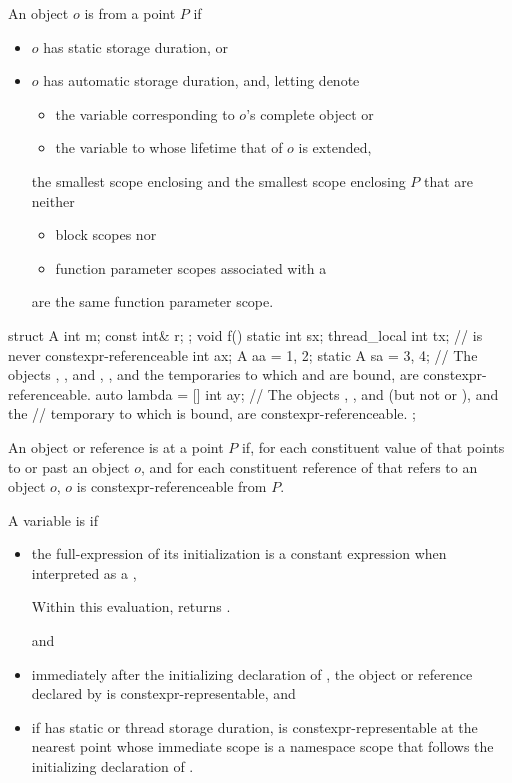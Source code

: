 \pnum
An object $o$ is  from a point $P$ if
\begin{itemize}
\item
$o$ has static storage duration, or
\item
$o$ has automatic storage duration, and, letting  denote
\begin{itemize}
\item
the variable corresponding to $o$'s complete object or
\item
the variable to whose lifetime that of $o$ is extended,
\end{itemize}
the smallest scope enclosing  and the smallest scope enclosing $P$
that are neither
\begin{itemize}
\item
block scopes nor
\item
function parameter scopes associated with
a 
\end{itemize}
are the same function parameter scope.
\end{itemize}
\begin{example}
\begin{codeblock}
struct A {
  int m;
  const int& r;
};
void f() {
  static int sx;
  thread_local int tx;                  //  is never constexpr-referenceable
  int ax;
  A aa = {1, 2};
  static A sa = {3, 4};
  // The objects , , and , , and the temporaries to which  and  are bound, are constexpr-referenceable.
  auto lambda = [] {
    int ay;
    // The objects , , and  (but not  or ), and the
    // temporary to which  is bound, are constexpr-referenceable.
  };
}
\end{codeblock}
\end{example}

\pnum
An object or reference  is
 at a point $P$ if,
for each constituent value of  that points to or past an object $o$,
and for each constituent reference of  that refers to an object $o$,
$o$ is constexpr-referenceable from $P$.

\pnum
A variable  is  if
\begin{itemize}
\item
the full-expression of its initialization is a constant expression
when interpreted as a ,
\begin{note}
Within this evaluation,
returns .
\end{note}
and
\item
immediately after the initializing declaration of ,
the object or reference  declared by 
is constexpr-representable, and
\item
if  has static or thread storage duration,
 is constexpr-representable at the nearest point
whose immediate scope is a namespace scope
that follows the initializing declaration of .
\end{itemize}

